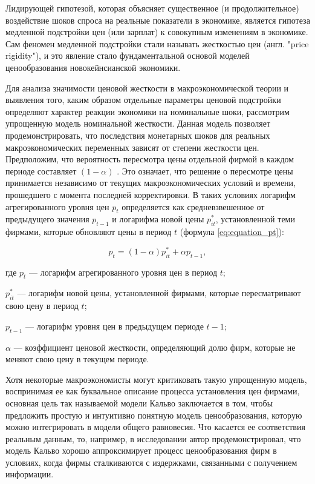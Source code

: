 Лидирующей гипотезой, которая объясняет существенное (и продолжительное) воздействие шоков спроса на реальные показатели в экономике, является гипотеза медленной подстройки цен (или зарплат) к совокупным изменениям в экономике. Сам феномен медленной подстройки стали называть жесткостью цен (англ. "price rigidity"), и это явление стало фундаментальной основой моделей ценообразования новокейнсианской экономики.

Для анализа значимости ценовой жесткости в макроэкономической теории и выявления того, каким образом отдельные параметры ценовой подстройки определяют характер реакции экономики на номинальные шоки, рассмотрим упрощенную модель номинальной жесткости. Данная модель позволяет продемонстрировать, что последствия монетарных шоков для реальных макроэкономических переменных зависят от степени жесткости цен. Предположим, что вероятность пересмотра цены отдельной фирмой в каждом периоде составляет $(1 - \alpha)$ \cite{lucas1972expectations}. Это означает, что решение о пересмотре цены принимается независимо от текущих макроэкономических условий и времени, прошедшего с момента последней корректировки. В таких условиях логарифм агрегированного уровня цен $p_t$ определяется как средневзвешенное от предыдущего значения $p_{t-1}$ и логарифма новой цены $p_{it}^*$, установленной теми фирмами, которые обновляют цены в период $t$ (формула \eqref{eq:equation_pt}):

\begin{equation}
	\label{eq:equation_pt}
	p_t = (1 - \alpha) p_{it}^* + \alpha p_{t-1},
\end{equation}

где $p_t$ — логарифм агрегированного уровня цен в период $t$;
\par
$p_{it}^\ast$ — логарифм новой цены, установленной фирмами, которые пересматривают свою цену в период $t$;
\par
$p_{t-1}$ — логарифм уровня цен в предыдущем периоде $t{-}1$;
\par
$\alpha$ — коэффициент ценовой жесткости, определяющий долю фирм, которые не меняют свою цену в текущем периоде.


Хотя некоторые макроэкономисты могут критиковать такую упрощенную модель, воспринимая ее как буквальное описание процесса установления цен фирмами, основная цель так называемой модели Кальво заключается в том, чтобы предложить простую и интуитивно понятную модель ценообразования, которую можно интегрировать в модели общего равновесия. Что касается ее соответствия реальным данным, то, например, в исследовании \cite{Woodford2009} автор продемонстрировал, что модель Кальво хорошо аппроксимирует процесс ценообразования фирм в условиях, когда фирмы сталкиваются с издержками, связанными с получением информации.

